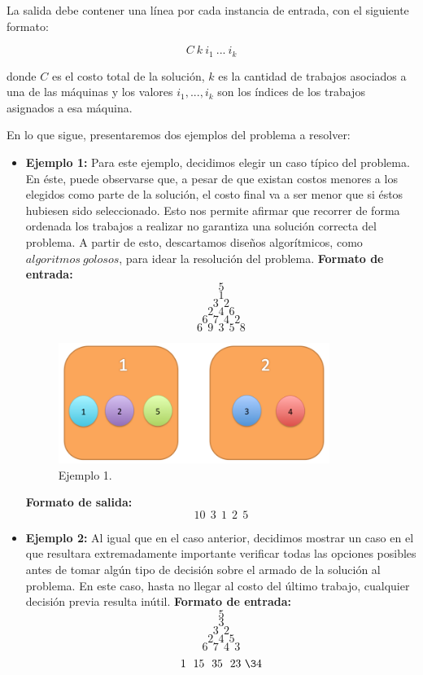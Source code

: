 La salida debe contener una línea por cada instancia de entrada, con el siguiente formato:

$$C\ k\ i_{1}\ ...\ i_{k}$$


donde \textbf{$C$} es el costo total de la solución, $k$ es la cantidad de trabajos asociados a una de las máquinas y los valores $i_{1},...,i_{k}$ son los índices de los trabajos asignados a esa máquina.\newline

En lo que sigue, presentaremos dos ejemplos del problema a resolver:
\begin{itemize}
\item {\large{\textbf{Ejemplo 1:}}}\newline
\newline
Para este ejemplo, decidimos elegir un caso típico del problema. En éste, puede observarse que, a pesar de que existan costos menores a los elegidos como parte de la solución, el costo final va a ser menor que si éstos hubiesen sido seleccionado. Esto nos permite afirmar que recorrer de forma ordenada los trabajos a realizar no garantiza una solución correcta del problema. A partir de esto, descartamos diseños algorítmicos, como $algoritmos\ golosos$, para idear la resolución del problema.\newline
\newline
\textbf{Formato de entrada:}
$$5$$
$$1$$
$$3\ \ 2$$
$$2\ \ 4\ \ 6$$
$$6\ \ 7\ \ 4\ \ 2$$
$$6\ \ 9\ \ 3\ \ 5\ \ 8$$

\begin{figure}[H] %
\begin{center}
\includegraphics[width=250pt]{../imgs/ejemplo1ej1.jpg}
\caption{Ejemplo 1.}
\end{center}
\end{figure}

\textbf{Formato de salida:}
$$10\ \ 3\ \ 1\ \ 2\ \ 5$$
\item {\large{\textbf{Ejemplo 2:}}}\newline
\newline
Al igual que en el caso anterior, decidimos mostrar un caso en el que resultara extremadamente importante verificar todas las opciones posibles antes de tomar algún tipo de decisión sobre el armado de la solución al problema. En este caso, hasta no llegar al costo del último trabajo, cualquier decisión previa resulta inútil.\newline
\newline
\textbf{Formato de entrada:}
$$5$$
$$3$$
$$3\ \ 2$$
$$2\ \ 4\ \ 5$$
$$6\ \ 7\ \ 4\ \ 3$$
$$1\ \ 15\ \ 35\ \ 23\ \34$$


\end{itemize}
